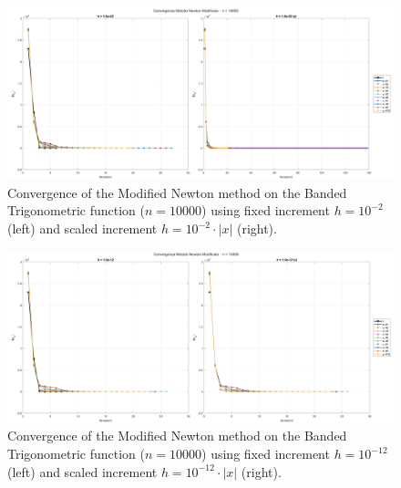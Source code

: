 \documentclass[a4paper,12pt]{article}
\begin{document}
\begin{itemize}
	\newpage
	
	\begin{figure}[H]
		\centering
		\includegraphics[width=\textwidth]{../immagini/banded_10k_h2.png}
		\caption{Convergence of the Modified Newton method on the Banded Trigonometric function ($n=10000$) using fixed increment $h = 10^{-2}$ (left) and scaled increment $h = 10^{-2}\cdot|x|$ (right).}
		\label{fig:bt_fd_10k_h2}
	\end{figure}
	
	\begin{figure}[H]%
		\centering
		\includegraphics[width=\textwidth]{../immagini/banded_10k_h12.png}
		\caption{Convergence of the Modified Newton method on the Banded Trigonometric function ($n=10000$) using fixed increment $h = 10^{-12}$ (left) and scaled increment $h = 10^{-12}\cdot|x|$ (right).}
		\label{fig:bt_fd_10k_h12}
	\end{figure}
	
	
	
	\newpage
	

\end{itemize}
\end{document}
